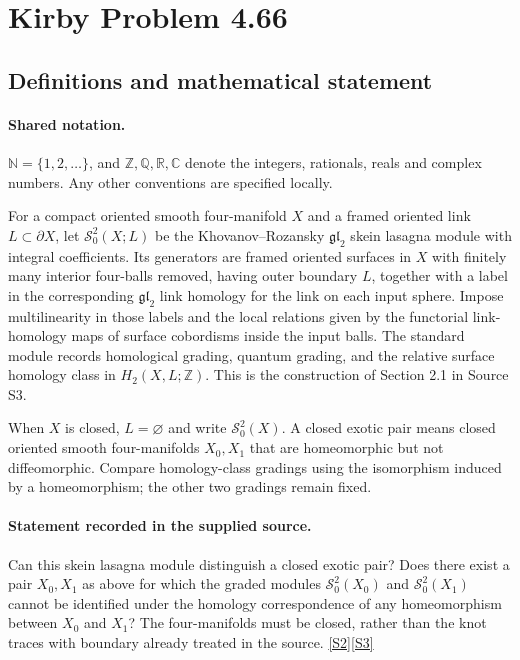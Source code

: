 \documentclass[11pt]{article}
\newcommand{\sref}[2]{\hyperlink{source:#1:#2}{[S#2]}}
\begin{document}
\section{Kirby Problem 4.66}\label{statement}

\subsection{Definitions and mathematical statement}

\paragraph{Shared notation.}$\mathbb N=\{1,2,\ldots\}$, and $\mathbb Z,\mathbb Q,\mathbb R,\mathbb C$ denote the integers, rationals, reals and complex numbers. Any other conventions are specified locally.


For a compact oriented smooth four-manifold $X$ and a framed oriented link $L\subset\partial X$, let $\mathcal S_0^2(X;L)$ be the Khovanov--Rozansky $\mathfrak{gl}_2$ skein lasagna module with integral coefficients. Its generators are framed oriented surfaces in $X$ with finitely many interior four-balls removed, having outer boundary $L$, together with a label in the corresponding $\mathfrak{gl}_2$ link homology for the link on each input sphere. Impose multilinearity in those labels and the local relations given by the functorial link-homology maps of surface cobordisms inside the input balls. The standard module records homological grading, quantum grading, and the relative surface homology class in $H_2(X,L;\mathbb Z)$. This is the construction of Section 2.1 in Source S3.

When $X$ is closed, $L=\varnothing$ and write $\mathcal S_0^2(X)$. A closed exotic pair means closed oriented smooth four-manifolds $X_0,X_1$ that are homeomorphic but not diffeomorphic. Compare homology-class gradings using the isomorphism induced by a homeomorphism; the other two gradings remain fixed.
\paragraph{Statement recorded in the supplied source.}
Can this skein lasagna module distinguish a closed exotic pair? Does there exist a pair $X_0,X_1$ as above for which the graded modules $\mathcal S_0^2(X_0)$ and $\mathcal S_0^2(X_1)$ cannot be identified under the homology correspondence of any homeomorphism between $X_0$ and $X_1$? The four-manifolds must be closed, rather than the knot traces with boundary already treated in the source. \sref{statement}{2}\sref{statement}{3}
\end{document}
